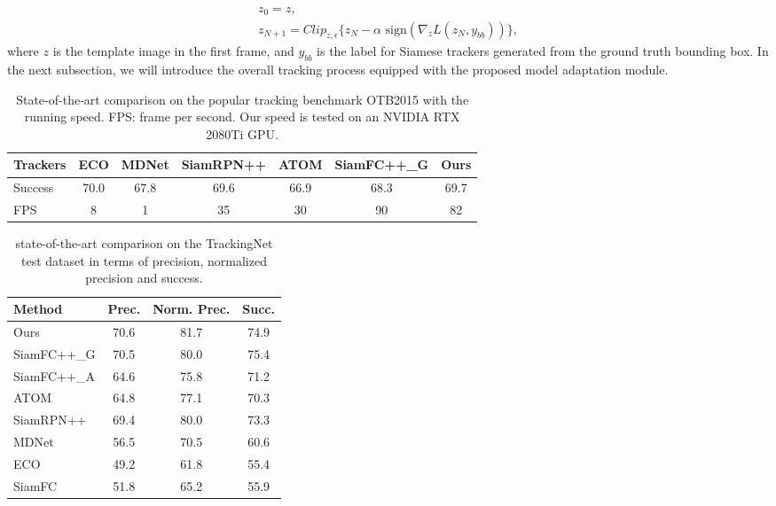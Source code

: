 \begin{equation}
    \begin{gathered}
        z_0 = z,\\
        z_{N+1} = Clip_{z,\epsilon}\{z_N -\alpha \text{ sign}(\nabla_z L(z_N,y_{bb}))\},
    \end{gathered}
    \label{equ:adaptaion}
\end{equation}
where $z$ is the template image in the first frame, and $y_{bb}$ is the label for Siamese trackers generated from the ground truth bounding box. In the next subsection, we will introduce the overall tracking process equipped with the proposed model adaptation module.

\begin{table}[t]
\renewcommand\arraystretch{0.8}
\caption{State-of-the-art comparison on the popular tracking benchmark OTB2015 with the running speed. FPS: frame per second. Our speed is tested on an NVIDIA RTX 2080Ti GPU.}
\setlength{\tabcolsep}{3pt}
\begin{center}
\begin{tabular}{l | c c c c c c}
\toprule
Trackers & ECO & MDNet & SiamRPN++ & ATOM & SiamFC++\_G & Ours \\
\midrule
Success & 70.0 & 67.8  & 69.6      & 66.9      & 68.3       & 69.7 \\
FPS     & 8    & 1     & 35        & 30       & 90         & 82  \\
\bottomrule
\end{tabular}
\end{center}
\label{table:otb}
\end{table}

\begin{table}[t]
\renewcommand\arraystretch{0.8}
\centering
\caption{state-of-the-art comparison on the TrackingNet test dataset in terms of precision, normalized precision and success.}
\begin{tabular}{l c c c}
\toprule
Method   &  Prec.   &  Norm. Prec. & Succ.  \\
\midrule
Ours  &  70.6&  81.7 &74.9 \\
SiamFC++\_G& 70.5 & 80.0 & 75.4 \\
SiamFC++\_A  & 64.6 & 75.8 & 71.2 \\
ATOM              & 64.8 & 77.1 & 70.3 \\
SiamRPN++&  69.4 & 80.0 &73.3 \\
MDNet	 &  56.5&  70.5 &60.6 \\
ECO	 &  49.2&  61.8 &55.4 \\
SiamFC	 &  51.8&  65.2 &55.9 \\
\bottomrule
\end{tabular}
\label{tabel:trackingnet}
\end{table}

